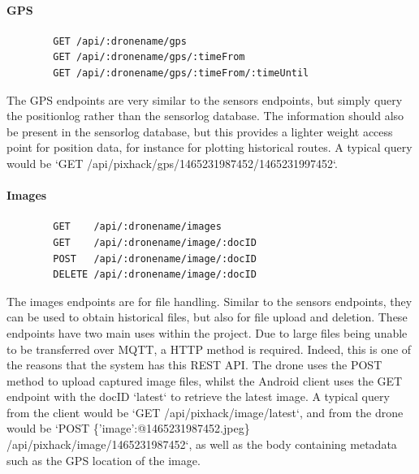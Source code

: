 \documentclass{article}
\begin{document}
\paragraph{GPS}
\begin{center}
	\begin{lstlisting}
		GET /api/:dronename/gps
		GET /api/:dronename/gps/:timeFrom
		GET /api/:dronename/gps/:timeFrom/:timeUntil
	\end{lstlisting}
\end{center}
The GPS endpoints are very similar to the sensors endpoints, but simply query the positionlog rather than the sensorlog database. The information should also be present in the sensorlog database, but this provides a lighter weight access point for position data, for instance for plotting historical routes. A typical query would be `GET /api/pixhack/gps/1465231987452/1465231997452`.


\paragraph{Images}
\begin{center}
	\begin{lstlisting}
		GET    /api/:dronename/images
		GET    /api/:dronename/image/:docID
		POST   /api/:dronename/image/:docID
		DELETE /api/:dronename/image/:docID
	\end{lstlisting}
\end{center}
The images endpoints are for file handling. Similar to the sensors endpoints, they can be used to obtain historical files, but also for file upload and deletion. These endpoints have two main uses within the project. Due to large files being unable to be transferred over MQTT, a HTTP method is required. Indeed, this is one of the reasons that the system has this REST API. The drone uses the POST method to upload captured image files, whilst the Android client uses the GET endpoint with the docID `latest` to retrieve the latest image. A typical query from the client would be `GET /api/pixhack/image/latest`, and from the drone would be `POST \{'image':@1465231987452.jpeg\} /api/pixhack/image/1465231987452`, as well as the body containing metadata such as the GPS location of the image. 
\end{document}
